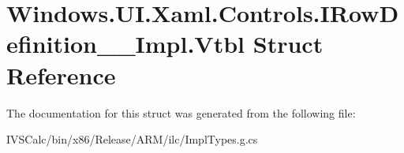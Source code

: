 \hypertarget{struct_windows_1_1_u_i_1_1_xaml_1_1_controls_1_1_i_row_definition_____impl_1_1_vtbl}{}\section{Windows.\+U\+I.\+Xaml.\+Controls.\+I\+Row\+Definition\+\_\+\+\_\+\+Impl.\+Vtbl Struct Reference}
\label{struct_windows_1_1_u_i_1_1_xaml_1_1_controls_1_1_i_row_definition_____impl_1_1_vtbl}


The documentation for this struct was generated from the following file\+:\begin{DoxyCompactItemize}
\item 
I\+V\+S\+Calc/bin/x86/\+Release/\+A\+R\+M/ilc/Impl\+Types.\+g.\+cs\end{DoxyCompactItemize}
